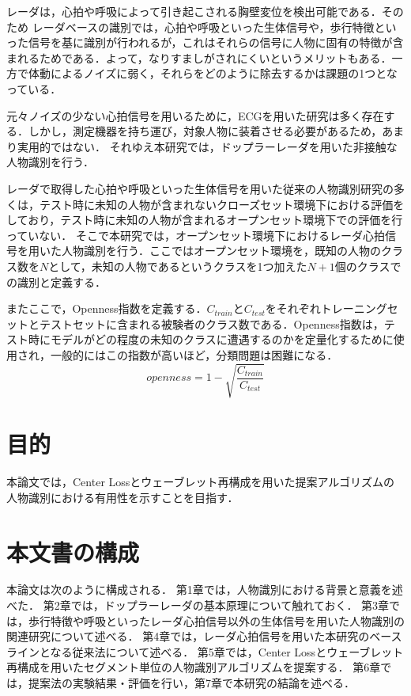 レーダは，心拍や呼吸によって引き起こされる胸壁変位を検出可能である\cite{paper:Wireless_survey}．そのため
レーダベースの識別では，心拍や呼吸といった生体信号や，歩行特徴といった信号を基に識別が行われるが，これはそれらの信号に人物に固有の特徴が含まれるためである．よって，なりすましがされにくいというメリットもある\cite{paper:HeartSignature}．一方で体動によるノイズに弱く，それらをどのように除去するかは課題の1つとなっている．

元々ノイズの少ない心拍信号を用いるために，ECGを用いた研究は多く存在する\cite{paper:ecg1, paper:ecg2, paper:ensemble}．しかし，測定機器を持ち運び，対象人物に装着させる必要があるため，あまり実用的ではない\cite{paper:Xing}．
それゆえ本研究では，ドップラーレーダを用いた非接触な人物識別を行う．

レーダで取得した心拍や呼吸といった生体信号を用いた従来の人物識別研究の多くは，テスト時に未知の人物が含まれないクローズセット環境下における評価をしており，テスト時に未知の人物が含まれるオープンセット環境下での評価を行っていない．
そこで本研究では，オープンセット環境下におけるレーダ心拍信号を用いた人物識別を行う．ここではオープンセット環境を，既知の人物のクラス数を$N$として，未知の人物であるというクラスを1つ加えた$N+1$個のクラスでの識別と定義する．

またここで，Openness指数を定義する．$C_{train}$と$C_{test}$をそれぞれトレーニングセットとテストセットに含まれる被験者のクラス数である．Openness指数は，テスト時にモデルがどの程度の未知のクラスに遭遇するのかを定量化するために使用され，一般的にはこの指数が高いほど，分類問題は困難になる\cite{paper:HeartSignature}．
\begin{equation}\label{}
  openness = 1 - \sqrt{\frac{C_{train}}{C_{test}}}
\end{equation}

\section{目的}
本論文では，Center Lossとウェーブレット再構成を用いた提案アルゴリズムの人物識別における有用性を示すことを目指す．

\section{本文書の構成}
本論文は次のように構成される．
第1章では，人物識別における背景と意義を述べた．
第2章では，ドップラーレーダの基本原理について触れておく．
第3章では，歩行特徴や呼吸といったレーダ心拍信号以外の生体信号を用いた人物識別の関連研究について述べる．
第4章では，レーダ心拍信号を用いた本研究のベースラインとなる従来法について述べる．
第5章では，Center Lossとウェーブレット再構成を用いたセグメント単位の人物識別アルゴリズムを提案する．
第6章では，提案法の実験結果・評価を行い，第7章で本研究の結論を述べる．


